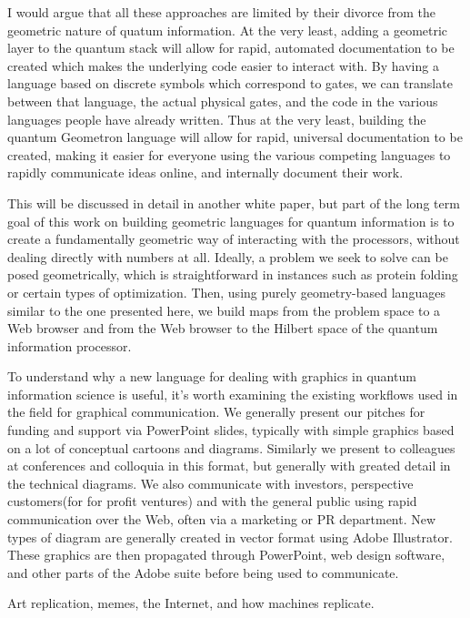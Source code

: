 \documentclass[11pt]{article}
\begin{document}
    I would argue that all these approaches are limited by their divorce from the geometric nature of quatum information.  At the very least, adding a geometric layer to the quantum stack will allow for rapid, automated documentation to be created which makes the underlying code easier to interact with.  By having a language based on discrete symbols which correspond to gates, we can translate between that language, the actual physical gates, and the code in the various languages people have already written.  Thus at the very least, building the quantum Geometron language will allow for rapid, universal documentation to be created, making it easier for everyone using the various competing languages to rapidly communicate ideas online, and internally document their work.  




    This will be discussed in detail in another white paper, but part of the long term goal of this work on building geometric languages for quantum information is to create a fundamentally geometric way of interacting with the processors, without dealing directly with numbers at all.  Ideally, a problem we seek to solve can be posed geometrically, which is straightforward in instances such as protein folding or certain types of optimization. Then, using purely geometry-based languages similar to the one presented here, we build maps from the problem space to a Web browser and from the Web browser to the Hilbert space of the quantum information processor.  




    To understand why a new language for dealing with graphics in quantum information science is useful, it's worth examining the existing workflows used in the field for graphical communication.  We generally present our pitches for funding and support via PowerPoint slides, typically with simple graphics based on a lot of conceptual cartoons and diagrams.  Similarly we present to colleagues at conferences and colloquia in this format, but generally with greated detail in the technical diagrams.  We also communicate with investors, perspective customers(for for profit ventures) and with the general public using rapid communication over the Web, often via a marketing or PR department.  New types of diagram are generally created in vector format using Adobe Illustrator.  These graphics are then propagated through PowerPoint, web design software, and other parts of the Adobe suite before being used to communicate.  

    Art replication, memes, the Internet, and how machines replicate.
\end{document}
